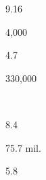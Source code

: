 \begin{description}[font=\normalfont,style=nextline]
\pagebreak
 \item[\langnameTifal] 
 \begin{multicols}{2}\begin{description}[font=\normalfont\itshape,noitemsep] 
 \item[] 
 \item[\pbnumberabbr] 9.16 
 \item[\family] \famTNG 
 \item[]
\item[\nativespeakers] 4,000 
 \item[\region] \regionPNG 
 \end{description}\end{multicols}
\item[\langnameTolaki] 
 \begin{multicols}{2}\begin{description}[font=\normalfont\itshape,noitemsep] 
 \item[] 
 \item[\pbnumberabbr] 4.7 
 \item[\family] \famAustronesian 
 \item[]
\item[\nativespeakers] 330,000 
 \item[\region] \regionSulawesi\ \Brackets{\regionIndonesia}
 \end{description}\end{multicols}
\item[\langnameTurkish] 
 \begin{multicols}{2}\begin{description}[font=\normalfont\itshape,noitemsep] 
 \item[] 
 \item[\pbnumberabbr] 8.4 
 \item[\family] \famTurkic 
 \item[]
\item[\nativespeakers] 75.7 mil. 
 \item[\region] \regionTurkey
 \end{description}\end{multicols}
\item[\langnameTzeltal] 
 \begin{multicols}{2}\begin{description}[font=\normalfont\itshape,noitemsep] 
 \item[] 
 \item[\pbnumberabbr] 5.8 
 \item[\family] \famMayan 
 \item[]

\end{description}
\end{multicols}
\end{description}
